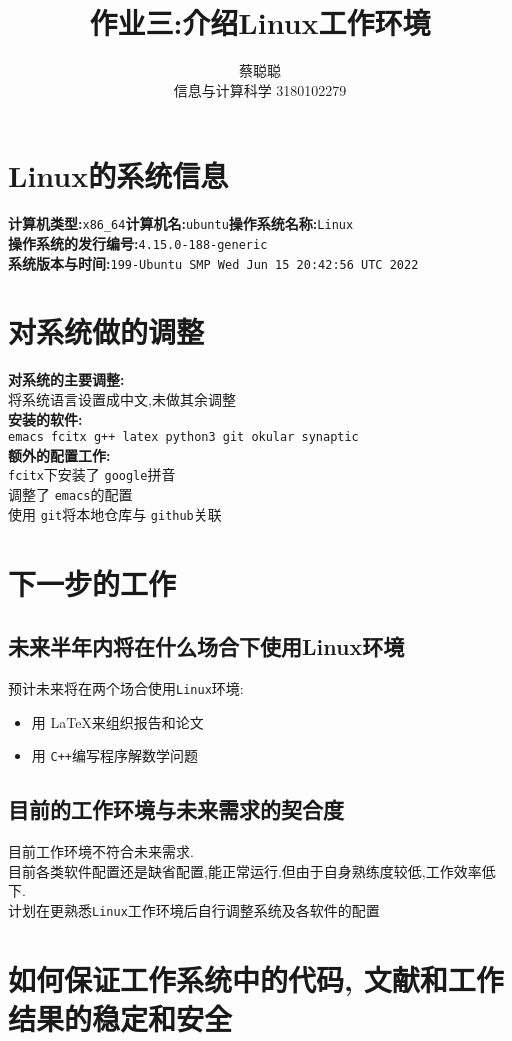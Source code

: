 \documentclass{ctexart}
\title{作业三:介绍Linux工作环境}
\author{蔡聪聪 \\ 信息与计算科学 3180102279}
\begin{document}
\maketitle

\section{Linux的系统信息}
\raggedright
\textbf{计算机类型:}\verb|x86_64|\quad \textbf{计算机名:}\verb|ubuntu|\quad \textbf{操作系统名称:}\verb|Linux|\\
\textbf{操作系统的发行编号:}\verb|4.15.0-188-generic|\\
\textbf{系统版本与时间:}\verb|199-Ubuntu SMP Wed Jun 15 20:42:56 UTC 2022|

\section{对系统做的调整}

\textbf{对系统的主要调整:}\\
将系统语言设置成中文,未做其余调整\\
\textbf{安装的软件:} \\
\verb|emacs fcitx g++ latex python3 git okular synaptic|\\
\textbf{额外的配置工作:}\\
\verb|fcitx|下安装了 \verb|google|拼音\\
调整了 \verb|emacs|的配置\\
使用 \verb|git|将本地仓库与 \verb|github|关联


\section{下一步的工作}

\subsection{未来半年内将在什么场合下使用Linux环境}
预计未来将在两个场合使用\verb|Linux|环境:
\begin{itemize}
\item 用 \LaTeX 来组织报告和论文
\item 用 \verb|C++|编写程序解数学问题
\end{itemize}


\subsection{目前的工作环境与未来需求的契合度}
目前工作环境不符合未来需求.\\
目前各类软件配置还是缺省配置,能正常运行.但由于自身熟练度较低,工作效率低下.\\
计划在更熟悉\verb|Linux|工作环境后自行调整系统及各软件的配置

\section{如何保证工作系统中的代码, 文献和工作结果的稳定和安全}
\end{document}
